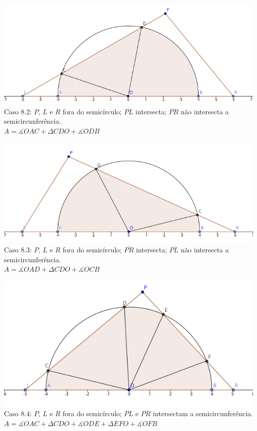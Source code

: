 \begin{center}
    \includegraphics[scale=1.7]{arremesso/editorial-imgs/caso82.png}\\
    Caso 8.2: $P$, $L$ e $R$ fora do semicírculo; $\overline{PL}$ intersecta; $\overline{PR}$ não intersecta a semicircunferência.\\
    $A = \measuredangle OAC + \Delta CDO + \measuredangle ODB$
\end{center}

\begin{center}
    \includegraphics[scale=1.7]{arremesso/editorial-imgs/caso83.png}\\
    Caso 8.3: $P$, $L$ e $R$ fora do semicírculo; $\overline{PR}$ intersecta; $\overline{PL}$ não intersecta a semicircunferência.\\
    $A = \measuredangle OAD + \Delta CDO + \measuredangle OCB$
\end{center}

\begin{center}
    \includegraphics[scale=1.7]{arremesso/editorial-imgs/caso84.png}\\
    Caso 8.4: $P$, $L$ e $R$ fora do semicírculo; $\overline{PL}$ e $\overline{PR}$ intersectam a semicircunferência.\\
    $A = \measuredangle OAC + \Delta CDO + \measuredangle ODE + \Delta EFO + \measuredangle OFB$
\end{center}

